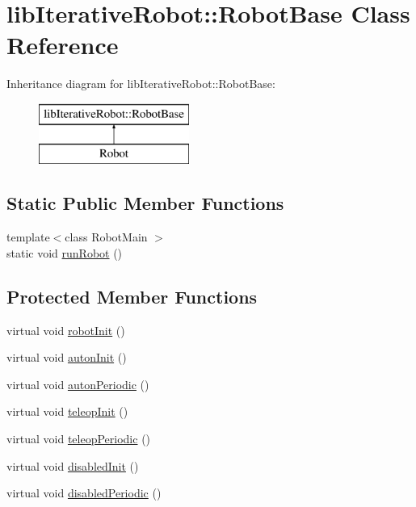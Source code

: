 \hypertarget{classlib_iterative_robot_1_1_robot_base}{}\section{lib\+Iterative\+Robot\+::Robot\+Base Class Reference}
\label{classlib_iterative_robot_1_1_robot_base}
Inheritance diagram for lib\+Iterative\+Robot\+::Robot\+Base\+:\begin{figure}[H]
\begin{center}
\leavevmode
\includegraphics[height=2.000000cm]{classlib_iterative_robot_1_1_robot_base}
\end{center}
\end{figure}
\subsection*{Static Public Member Functions}
\begin{DoxyCompactItemize}
\item 
{\footnotesize template$<$class Robot\+Main $>$ }\\static void \mbox{\hyperlink{classlib_iterative_robot_1_1_robot_base_a5a57c611cc6c2444e1c8d2fd514bd25c}{run\+Robot}} ()
\end{DoxyCompactItemize}
\subsection*{Protected Member Functions}
\begin{DoxyCompactItemize}
\item 
virtual void \mbox{\hyperlink{classlib_iterative_robot_1_1_robot_base_a1e690e472e901ac99bb7ce6f3b6a33ea}{robot\+Init}} ()
\item 
virtual void \mbox{\hyperlink{classlib_iterative_robot_1_1_robot_base_a8137d84aef11ed00a46cbc1bbb727a60}{auton\+Init}} ()
\item 
virtual void \mbox{\hyperlink{classlib_iterative_robot_1_1_robot_base_ac34d3dcb9388d4a8564eb781919eb825}{auton\+Periodic}} ()
\item 
virtual void \mbox{\hyperlink{classlib_iterative_robot_1_1_robot_base_a290bea17acf9bc884a490472e9d2e039}{teleop\+Init}} ()
\item 
virtual void \mbox{\hyperlink{classlib_iterative_robot_1_1_robot_base_a564ee86d582b598dd0713c067b352aef}{teleop\+Periodic}} ()
\item 
virtual void \mbox{\hyperlink{classlib_iterative_robot_1_1_robot_base_a12cfc52a6bac5b5a9ad7e61b47e9ecd2}{disabled\+Init}} ()
\item 
virtual void \mbox{\hyperlink{classlib_iterative_robot_1_1_robot_base_a8e1e85e215343baaaf3bdeedb89d9890}{disabled\+Periodic}} ()
\end{DoxyCompactItemize}
